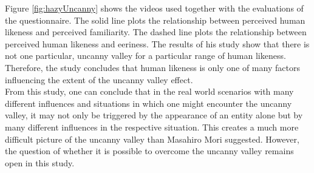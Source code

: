 Figure \ref{fig:hazyUncanny} shows the videos used together with the evaluations of the questionnaire. The solid line plots the relationship between perceived human likeness and perceived familiarity. The dashed line plots the relationship between
perceived human likeness and eeriness. The results of his study show that there is not one particular, uncanny valley for a particular range of human likeness. Therefore, the study  concludes that human likeness is only one of many factors influencing the extent of the uncanny valley effect.\\
From this study, one can conclude that in the real world scenarios with many different influences and situations in which one might encounter the uncanny valley,  it may not only be triggered by the appearance of an entity alone but by many different influences in the respective situation. This creates a much more difficult picture of the uncanny valley than Masahiro Mori suggested. However, the question of whether it is possible to overcome the uncanny valley remains open in this study.

